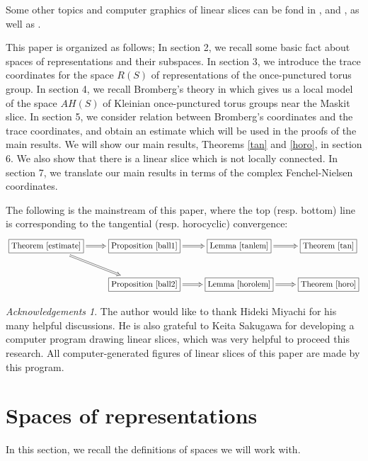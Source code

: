 \documentclass[12pt]{article}
\theoremstyle{plain}
\theoremstyle{definition}
\theoremstyle{remark}
\newtheorem*{ack}{Acknowledgements}
\begin{document}
Some other topics and computer graphics of linear slices  can be fond in 
\cite{Mc2}, \cite{MSW} and \cite{KY}, as well as \cite{PP}.  

This paper is organized as follows;
In section 2, we recall some basic fact about spaces of representations and their subspaces. 
In section 3, we introduce the trace coordinates for  the space $R(S)$ 
of representations  of the once-punctured torus group.  
In section 4, we recall Bromberg's theory in \cite{Br} which gives us a local model of the space $AH(S)$ 
of Kleinian once-punctured torus groups near the Maskit slice. 
In section 5, we consider relation between Bromberg's coordinates and the trace coordinates, 
and obtain an estimate which will be used in the proofs of the main results. 
We will show our main results, Theorems \ref{tan} and \ref{horo},  in section 6. 
We also show that there is a  linear slice 
which is not locally connected. 
In section 7, we translate our main results in terms of the complex Fenchel-Nielsen coordinates. 

The following is the mainstream of this paper,  where the top (resp. bottom) line is corresponding to the 
tangential (resp. horocyclic) convergence:  
\begin{eqnarray*}
\xymatrix{ 
\fbox{\text{Theorem \ref{estimate}}} \ar@{=>} [r] \ar@{=>}[dr]
& \fbox{\text{Proposition \ref{ball1}}} \ar@{=>}[r] 
& \fbox{\text{Lemma \ref{tanlem}}} \ar@{=>}[r] 
& \fbox{\text{Theorem \ref{tan}}} \\ 
& \fbox{\text{Proposition \ref{ball2}}} \ar@{=>}[r] 
& \fbox{\text{Lemma \ref{horolem}}} \ar@{=>}[r] 
& \fbox{\text{Theorem \ref{horo}}}
}
\end{eqnarray*}
 

\begin{ack}
The author would like to thank Hideki Miyachi for his many helpful discussions. 
He is also grateful to Keita Sakugawa for developing a computer program drawing linear slices, 
which was very helpful to proceed this research.    All computer-generated figures of linear slices 
of this paper are made by this program. 
\end{ack}


\section{Spaces of representations}

In this section, we recall the definitions of spaces we will work with. 
\end{document}
